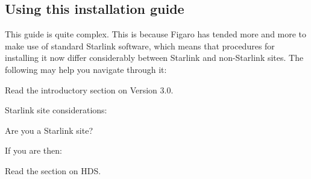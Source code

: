 \subsection{Using this installation guide} 

This guide is quite complex. This is because Figaro has tended more and more to
make use of standard Starlink software, which means that procedures for
installing it now differ considerably between Starlink and non-Starlink sites.
The following may help you navigate through it:

Read the introductory section on Version 3.0.

Starlink site considerations:
\begin{description}
	\item Are you a Starlink site?
\end{description}
If you are then:

Read the section on HDS.

